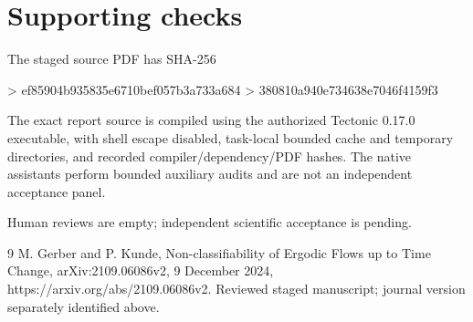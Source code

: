 \documentclass[10pt]{article}
\begin{document}
\section*{Supporting checks}
The staged source PDF has SHA-256\par
> ef85904b935835e6710bef057b3a733a684
> 380810a940e734638e7046f4159f3\par
The exact report source is compiled using the authorized Tectonic 0.17.0 executable, with shell escape disabled, task-local bounded cache and temporary directories, and recorded compiler/dependency/PDF hashes. The native assistants perform bounded auxiliary audits and are not an independent acceptance panel.\par
Human reviews are empty; independent scientific acceptance is pending.\par
9 M. Gerber and P. Kunde, Non-classifiability of Ergodic Flows up to Time Change, arXiv:2109.06086v2, 9 December 2024, https://arxiv.org/abs/2109.06086v2. Reviewed staged manuscript; journal version separately identified above.\par
\end{document}
